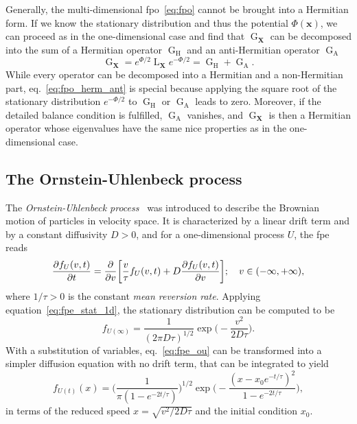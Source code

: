 \documentclass[a4paper,12pt]{book}
\begin{document}
Generally, the multi-dimensional \acrshort{fpo}~\eqref{eq:fpo} cannot be brought into a Hermitian form. If we know the stationary distribution and thus the potential $\Phi(\bm{x})$, we can proceed as in the one-dimensional case and find that $\operatorname{G}_{\bm{X}}$ can be decomposed into the sum of a Hermitian operator $\operatorname{G}_\text{H}$ and an anti-Hermitian operator $\operatorname{G}_\text{A}$
\begin{equation}
    \label{eq:fpo_herm_ant}
    \operatorname{G}_{\bm{X}} = e^{\Phi/2} \operatorname{L}_{\bm{X}} e^{-\Phi/2} = \operatorname{G}_\text{H} + \operatorname{G}_\text{A}. 
\end{equation}
While every operator can be decomposed into a Hermitian and a non-Hermitian part, eq.~\eqref{eq:fpo_herm_ant} is special because applying the square root of the stationary distribution $e^{-\Phi/2}$ to $\operatorname{G}_\text{H}$ or $\operatorname{G}_\text{A}$ leads to zero. Moreover, if the detailed balance condition is fulfilled, $\operatorname{G}_\text{A}$ vanishes, and $\operatorname{G}_{\bm{X}}$ is then a Hermitian operator whose eigenvalues have the same nice properties as in the one-dimensional case.



\subsection{The Ornstein-Uhlenbeck process}
The \textit{Ornstein-Uhlenbeck process}~\parencite{OrnUHl1930} was introduced to describe the Brownian motion of particles in velocity space. It is characterized by a linear drift term and by a constant diffusivity $D>0$, and for a one-dimensional process $U$, the \acrshort{fpe} reads
\begin{equation}
\label{eq:fpe_ou}
    \pdv{f_U(v,t)}{t} = \pdv{}{v} \biggl[\frac{v}{\tau} f_U(v,t) + D\pdv{f_U(v,t)}{v} \biggr]; \quad v\in (-\infty,+\infty),
\end{equation}
where $1/\tau > 0$ is the constant \textit{mean reversion rate}. Applying equation~\eqref{eq:fpe_stat_1d}, the stationary distribution can be computed to be
\begin{equation}
\label{eq:ou_stat}
    f_{U(\infty)} = \frac{1}{(2\pi D \tau)^{1/2}} \exp \biggl( -\frac{v^2}{2D\tau}   \biggr).
\end{equation}
With a substitution of variables, eq.~\eqref{eq:fpe_ou} can be transformed into a simpler diffusion equation with no drift term, that can be integrated to yield
\begin{equation}
\label{eq:sol_ou}
    f_{U(t)}(x) = \biggl(\frac{1}{\pi (1-e^{-2t/\tau})}\biggr)^{1/2} \exp \biggl( -\frac{(x-x_0 e^{-t/\tau})^2}{1-e^{-2t/\tau}}  \biggr),
\end{equation}
in terms of the reduced speed $x=\sqrt{v^2/2D\tau}$ and the initial condition $x_0$. 
\end{document}
